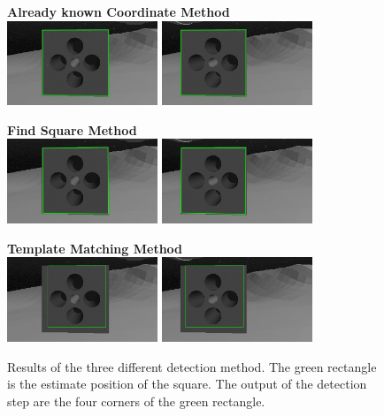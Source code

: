 \begin{figure}[H]
	\centering
	
	\textbf{Already known Coordinate Method}\\
	\includegraphics[width=4.5cm]{detection/clickDetLeft.png}
	\includegraphics[width=4.5cm]{detection/clickDetRight.png}\\
	\vspace{30px}
	
	\textbf{Find Square Method}\\
	\includegraphics[width=4.5cm]{detection/squareDetLeft.png}
	\includegraphics[width=4.5cm]{detection/squareDetRight.png}\\
	\vspace{30px}
		
	\textbf{Template Matching Method}\\
	\includegraphics[width=4.5cm]{detection/tempDetLeft.png}
	\includegraphics[width=4.5cm]{detection/tempDetRight.png}
	
	\caption[Hole Detection results with the three different methods]{Results of the three different detection method. The green rectangle is the estimate position of the square. The output of the detection step are the four corners of the green rectangle.}
	\label{fig:detectResults}
\end{figure}


